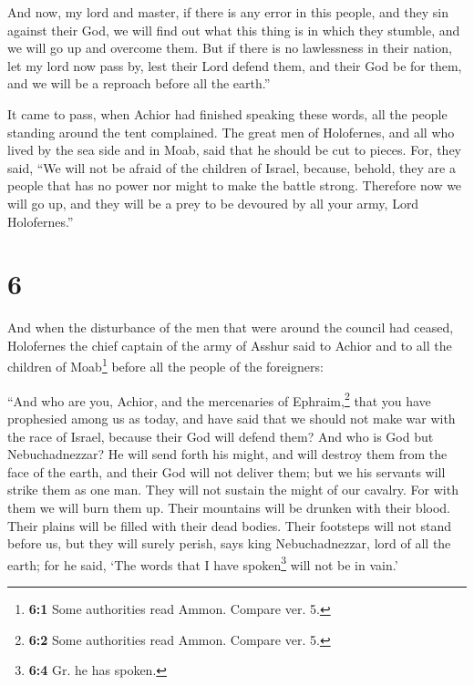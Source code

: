  And now, my lord and master, if there is any error in
this people, and they sin against their God, we will find out what this
thing is in which they stumble, and we will go up and overcome them.
 But if there is no lawlessness in their nation, let my
lord now pass by, lest their Lord defend them, and their God be for
them, and we will be a reproach before all the earth.''

 It came to pass, when Achior had finished speaking these
words, all the people standing around the tent complained. The great men
of Holofernes, and all who lived by the sea side and in Moab, said that
he should be cut to pieces.  For, they said, ``We will
not be afraid of the children of Israel, because, behold, they are a
people that has no power nor might to make the battle strong.
 Therefore now we will go up, and they will be a prey to
be devoured by all your army, Lord Holofernes.''

\hypertarget{section-5}{%
\section{6}\label{section-5}}

 And when the disturbance of the men that were around the
council had ceased, Holofernes the chief captain of the army of Asshur
said to Achior and to all the children of Moab\footnote{\textbf{6:1}
  Some authorities read Ammon. Compare ver. 5.} before all the people of
the foreigners:

 ``And who are you, Achior, and the mercenaries of
Ephraim,\footnote{\textbf{6:2} Some authorities read Ammon. Compare ver.
  5.} that you have prophesied among us as today, and have said that we
should not make war with the race of Israel, because their God will
defend them? And who is God but Nebuchadnezzar?  He will
send forth his might, and will destroy them from the face of the earth,
and their God will not deliver them; but we his servants will strike
them as one man. They will not sustain the might of our cavalry.
 For with them we will burn them up. Their mountains will
be drunken with their blood. Their plains will be filled with their dead
bodies. Their footsteps will not stand before us, but they will surely
perish, says king Nebuchadnezzar, lord of all the earth; for he said,
`The words that I have spoken\footnote{\textbf{6:4} Gr. he has spoken.}
will not be in vain.'

